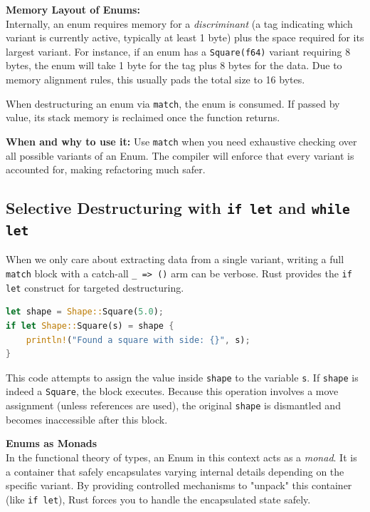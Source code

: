 \begin{memoryblock}
\textbf{Memory Layout of Enums:}\\
Internally, an enum requires memory for a \emph{discriminant} (a tag indicating which variant is currently active, typically at least 1 byte) plus the space required for its largest variant. For instance, if an enum has a \texttt{Square(f64)} variant requiring 8 bytes, the enum will take 1 byte for the tag plus 8 bytes for the data. Due to memory alignment rules, this usually pads the total size to 16 bytes.

When destructuring an enum via \texttt{match}, the enum is consumed. If passed by value, its stack memory is reclaimed once the function returns.
\end{memoryblock}

\textbf{When and why to use it:} Use \texttt{match} when you need exhaustive checking over all possible variants of an Enum. The compiler will enforce that every variant is accounted for, making refactoring much safer.

\subsection{Selective Destructuring with \texttt{if let} and \texttt{while let}}

When we only care about extracting data from a single variant, writing a full \texttt{match} block with a catch-all \texttt{\_ => ()} arm can be verbose. Rust provides the \texttt{if let} construct for targeted destructuring.

\begin{lstlisting}[language=Rust]
let shape = Shape::Square(5.0);
if let Shape::Square(s) = shape {
    println!("Found a square with side: {}", s);
}
\end{lstlisting}

This code attempts to assign the value inside \texttt{shape} to the variable \texttt{s}. If \texttt{shape} is indeed a \texttt{Square}, the block executes. Because this operation involves a move assignment (unless references are used), the original \texttt{shape} is dismantled and becomes inaccessible after this block.

\begin{insightbox}
\textbf{Enums as Monads}\\
In the functional theory of types, an Enum in this context acts as a \emph{monad}. It is a container that safely encapsulates varying internal details depending on the specific variant. By providing controlled mechanisms to "unpack" this container (like \texttt{if let}), Rust forces you to handle the encapsulated state safely.
\end{insightbox}


